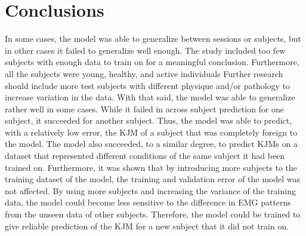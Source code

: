 \documentclass[../main.tex]{subfiles}
\begin{document}
\chapter{Conclusions}
In some cases, the model was able to generalize between sessions or subjects, but in other cases it failed to generalize well enough.
The study included too few subjects with enough data to train on for a meaningful conclusion.
Furthermore, all the subjects were young, healthy, and active individuals
Further research should include more test subjects with different physique and/or pathology to increase variation in the data.
With that said, the model was able to generalize rather well in some cases.
While it failed in across subject prediction for one subject, it succeeded for another subject.
Thus, the model was able to predict, with a relatively low error, the \ac{KJM} of a subject that was completely foreign to the model.
The model also succeeded, to a similar degree, to predict \acp{KJM} on a dataset that represented different conditions of the same subject it had been trained on.
Furthermore, it was shown that by introducing more subjects to the training dataset of the model, the training and validation error of the model was not affected.
By using more subjects and increasing the variance of the training data, the model could become less sensitive to the difference in \ac{EMG} patterns from the unseen data of other subjects.
Therefore, the model could be trained to give reliable prediction of the \ac{KJM} for a new subject that it did not train on.
\end{document}
